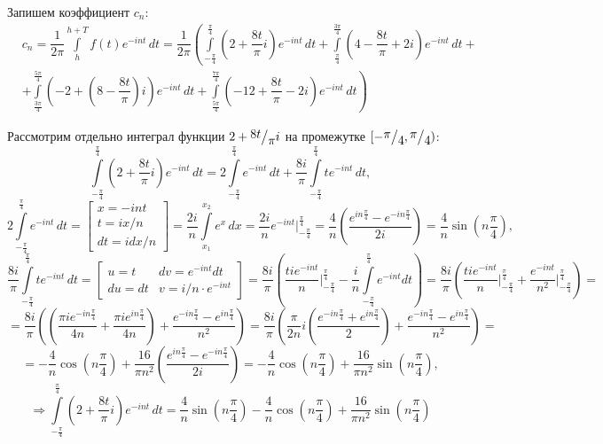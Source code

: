 \documentclass[a4paper, 16pt]{article}
\newcommand{\frc}[2]{\raisebox{2pt}{$#1$}\big/\raisebox{-3pt}{$#2$}}
\begin{document}
\noindent Запишем коэффициент $c_n$:
\begin{align*}
    & c_n =\dfrac{1}{2\pi}\int\limits_{h}^{h+T}f(t)e^{-int}\,dt=\dfrac{1}{2\pi}\left(\int\limits_{-\frac{\pi}{4}}^{\frac{\pi}{4}}\left(2+\dfrac{8t}{\pi}i\right)e^{-int}\,dt+\int\limits_{\frac{\pi}{4}}^{\frac{3\pi}{4}}\left(4-\dfrac{8t}{\pi}+2i\right)e^{-int}\,dt+\right.\\
    &\left. +\int\limits_{\frac{3\pi}{4}}^{\frac{5\pi}{4}}\left(-2+\left(8-\dfrac{8t}{\pi}\right)i\right)e^{-int}\,dt+\int\limits_{\frac{5\pi}{4}}^{\frac{7\pi}{4}}\left(-12+\dfrac{8t}{\pi}-2i\right)e^{-int}\,dt\right)
\end{align*}


\noindent Рассмотрим отдельно интеграл функции $2+\frc{8t}{\pi}i$ на промежутке $[-\frc{\pi}{4}, \frc{\pi}{4})$:
$$
\int\limits_{-\frac{\pi}{4}}^{\frac{\pi}{4}}\left(2+\dfrac{8t}{\pi}i\right)e^{-int}\,dt=
2\int\limits_{-\frac{\pi}{4}}^{\frac{\pi}{4}}e^{-int}\,dt+\dfrac{8i}{\pi}\int\limits_{-\frac{\pi}{4}}^{\frac{\pi}{4}}te^{-int}\,dt,
$$
$$
2\int\limits_{-\frac{\pi}{4}}^{\frac{\pi}{4}}e^{-int}\,dt=\begin{bmatrix}
    x=-int\\
    t=ix/n\\
    dt=idx/n
\end{bmatrix}=
\dfrac{2i}{n}\int\limits_{x_1}^{x_2}e^x\,dx=\dfrac{2i}{n}e^{-int}\bigg|_{-\frac{\pi}{4}}^{\frac{\pi}{4}}=
\dfrac{4}{n}\left(\dfrac{e^{in\frac{\pi}{4}}-e^{-in\frac{\pi}{4}}}{2i}\right)=\dfrac{4}{n}\sin{\left(n\dfrac{\pi}{4}\right)},
$$
$$
\dfrac{8i}{\pi}\int\limits_{-\frac{\pi}{4}}^{\frac{\pi}{4}}te^{-int}\,dt=
\begin{bmatrix}
    u=t & dv=e^{-int}dt\\
    du=dt & v=i/n\cdot e^{-int}
\end{bmatrix}=
\dfrac{8i}{\pi}\left(\dfrac{tie^{-int}}{n}\bigg|_{-\frac{\pi}{4}}^{\frac{\pi}{4}}-\dfrac{i}{n}\int\limits_{-\frac{\pi}{4}}^{\frac{\pi}{4}}e^{-int}dt\right)=
\dfrac{8i}{\pi}\left(\dfrac{tie^{-int}}{n}\bigg|_{-\frac{\pi}{4}}^{\frac{\pi}{4}}+\dfrac{e^{-int}}{n^2}\bigg|_{-\frac{\pi}{4}}^{\frac{\pi}{4}}\right)=
$$
$$
=\dfrac{8i}{\pi}\left(\left(\dfrac{\pi ie^{-i n\frac{\pi}{4}}}{4n}+\dfrac{\pi ie^{in\frac{\pi}{4}}}{4n}\right)+\dfrac{e^{-in\frac{\pi}{4}}-e^{in\frac{\pi}{4}}}{n^2}\right)=
\dfrac{8i}{\pi}\left(\dfrac{\pi}{2n}i\left(\dfrac{e^{-in\frac{\pi}{4}}+e^{in\frac{\pi}{4}}}{2}\right)+\dfrac{e^{-in\frac{\pi}{4}}-e^{in\frac{\pi}{4}}}{n^2}\right)=
$$
$$
=-\dfrac{4}{n}\cos{\left(n\dfrac{\pi}{4}\right)}+\dfrac{16}{\pi n^2}\left(\dfrac{e^{in\frac{\pi}{4}}-e^{-in\frac{\pi}{4}}}{2i}\right)=
-\dfrac{4}{n}\cos{\left(n\dfrac{\pi}{4}\right)}+\dfrac{16}{\pi n^2}\sin{\left(n\dfrac{\pi}{4}\right)},
$$
$$
\Rightarrow\int\limits_{-\frac{\pi}{4}}^{\frac{\pi}{4}}\left(2+\dfrac{8t}{\pi}i\right)e^{-int}\,dt=
\dfrac{4}{n}\sin{\left(n\dfrac{\pi}{4}\right)}-\dfrac{4}{n}\cos{\left(n\dfrac{\pi}{4}\right)}+\dfrac{16}{\pi n^2}\sin{\left(n\dfrac{\pi}{4}\right)}
$$
\end{document}
